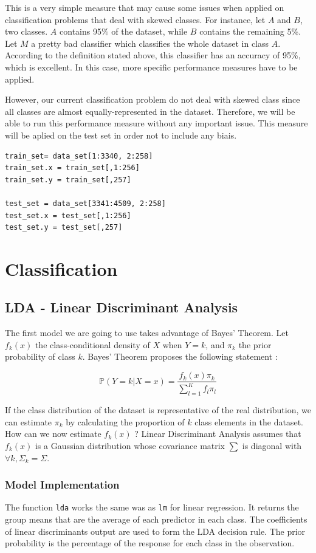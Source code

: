 \documentclass[]{report}
\begin{document}
This is a very simple measure that may cause some issues when applied on classification problems that deal with skewed classes. For instance, let $A$ and $B$, two classes. $A$ contains 95\% of the dataset, while $B$ contains the remaining 5\%. Let $M$ a pretty bad classifier which classifies the whole dataset in class $A$. According to the definition stated above, this classifier has an accuracy of 95\%, which is excellent. In this case, more specific performance measures have to be applied.

However, our current classification problem do not deal with skewed class since all classes are almost equally-represented in the dataset. Therefore, we will be able to run this performance measure without any important issue. This measure will be aplied on the test set in order not to include any biais.

\begin{lstlisting}
train_set= data_set[1:3340, 2:258]
train_set.x = train_set[,1:256]
train_set.y = train_set[,257]

test_set = data_set[3341:4509, 2:258]
test_set.x = test_set[,1:256]
test_set.y = test_set[,257]
\end{lstlisting}

\section{Classification}

\subsection{LDA - Linear Discriminant Analysis}
The first model we are going to use takes advantage of Bayes' Theorem. Let $f_k(x)$ the class-conditional density of $X$ when $Y=k$, and $\pi_k$ the prior probability of class $k$. Bayes' Theorem proposes the following statement : 

$$
\mathbb{P}(Y = k | X = x) = \frac{f_k(x)\pi_k}{\sum_{l = 1}^{K}f_l\pi_l} 
$$

If the class distribution of the dataset is representative of the real distribution, we can estimate $\pi_k$ by calculating the proportion of $k$ class elements in the dataset. How can we now estimate $f_k(x)$ ? Linear Discriminant Analysis assumes that $f_k(x)$ is a Gaussian distribution whose covariance matrix $\sum$  is diagonal with $\forall k, \Sigma_k = \Sigma$. 


\subsubsection{Model Implementation}
The function \texttt{lda} works the same was as \texttt{lm} for linear regression. It returns the group means that are the average of each predictor in each class. The coefficients of linear discriminants output are used to form the LDA decision rule. The prior probability is the percentage of the response for each class in the observation.
\end{document}
